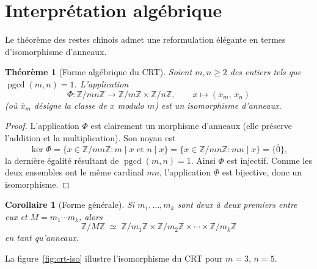 \documentclass[12pt,a4paper,openany]{book}
\theoremstyle{definition}
\theoremstyle{plain}
\newtheorem{theoreme}[definition]{Théorème}
\newtheorem{corollaire}[definition]{Corollaire}
\theoremstyle{remark}
\newcommand{\Z}{\mathbb{Z}}
\DeclareMathOperator{\pgcd}{pgcd}
\begin{document}
\section{Interprétation algébrique}
\label{sec:crt:algebrique}

Le théorème des restes chinois admet une reformulation élégante en termes
d'isomorphisme d'anneaux.

\begin{theoreme}[Forme algébrique du CRT]
\label{thm:crt-algebrique}
Soient $m, n \geq 2$ des entiers tels que $\pgcd(m, n) = 1$. L'application
\[
  \Phi : \Z/mn\Z \longrightarrow \Z/m\Z \times \Z/n\Z, \qquad
  \overline{x} \longmapsto (\overline{x}_m,\, \overline{x}_n)
\]
(où $\overline{x}_m$ désigne la classe de $x$ modulo $m$) est un
\emph{isomorphisme d'anneaux}.
\end{theoreme}

\begin{proof}
\label{proof:crt-algebrique}
L'application $\Phi$ est clairement un morphisme d'anneaux (elle préserve
l'addition et la multiplication). Son noyau est
\[
  \ker \Phi = \{ \overline{x} \in \Z/mn\Z : m \mid x \text{ et } n \mid x \}
            = \{ \overline{x} \in \Z/mn\Z : mn \mid x \}
            = \{ \overline{0} \},
\]
la dernière égalité résultant de $\pgcd(m, n) = 1$. Ainsi $\Phi$ est injectif.
Comme les deux ensembles ont le même cardinal $mn$, l'application $\Phi$ est
bijective, donc un isomorphisme.
\end{proof}

\begin{corollaire}[Forme générale]
\label{cor:crt-general}
Si $m_1, \ldots, m_k$ sont deux à deux premiers entre eux et $M = m_1 \cdots m_k$,
alors
\[
  \Z/M\Z \;\simeq\; \Z/m_1\Z \times \Z/m_2\Z \times \cdots \times \Z/m_k\Z
\]
en tant qu'anneaux.
\end{corollaire}

\medskip

La figure~\ref{fig:crt-iso} illustre l'isomorphisme du CRT pour $m = 3$, $n = 5$.
\end{document}
